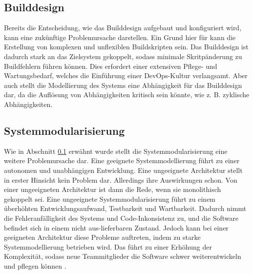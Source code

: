 \subsection{Builddesign} \label{builddesgin}
Bereits die Entscheidung, wie das Builddesign aufgebaut und konfiguriert wird, kann eine zukünftige Problemursache darstellen. Ein Grund hier für kann die Erstellung von komplexen und unflexiblen Buildskripten sein. Das Builddesign ist dadurch stark an das Zielsystem gekoppelt, sodass minimale Skritpänderung zu Buildfehlern führen können. Dies erfordert einer extensiven Pflege- und Wartungsbedarf, welches die Einführung einer DevOps-Kultur verlangsamt. Aber auch stellt die Modellierung des Systems eine Abhängigkeit für das Builddesign dar, da die Auflösung von Abhängigkeiten kritisch sein könnte, wie z. B. zyklische Abhängigkeiten.

\subsection{Systemmodularisierung}  \label{Systemmodularisierung}
Wie in Abschnitt \ref{builddesgin} erwähnt wurde stellt die Systemmodularisierung eine weitere Problemursache dar. Eine geeignete Systemmodellierung führt zu einer autonomen und unabhängigen Entwicklung. Eine ungeeignete Architektur stellt in erster Hinsicht kein Problem dar. Allerdings ihre Auswirkungen schon. Von einer ungeeigneten Architektur ist dann die Rede, wenn sie monolithisch gekoppelt sei. Eine ungeeignete Systemmodularisierung führt zu einem überhöhten Entwicklungsaufwand, Testbarkeit und Wartbarkeit. Dadurch nimmt die Fehleranfälligkeit des Systems und Code-Inkonsistenz zu, und die Software befindet sich in einem nicht aus-lieferbaren Zustand. Jedoch kann bei einer geeigneten Architektur diese Probleme auftreten, indem zu starke Systemmodellierung betrieben wird. Das führt zu einer Erhöhung der Komplexität, sodass neue Teammitglieder die Software schwer weiterentwickeln und pflegen können \cite{Laukkanen.2017}. 

